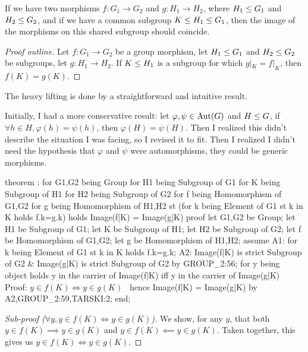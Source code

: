 \begin{theorem}
If we have two morphisms $f\colon G_{1}\to G_{2}$ and $g\colon H_{1}\to
H_{2}$, where $H_{1}\leq G_{1}$ and $H_{2}\leq G_{2}$, and if
we have a common subgroup $K\leq H_{1}\leq G_{1}$, then the
image of the morphisms on this shared subgroup should coincide.
\end{theorem}

\begin{proof}[Proof outline]
  Let $f\colon G_{1}\to G_{2}$ be a group morphism, let $H_{1}\leq G_{1}$
  and $H_{2}\leq G_{2}$ be subgroups, let $g\colon H_{1}\to H_{2}$.
  If $K\leq H_{1}$ is a subgroup for which $g|_{K}=f|_{K}$, then $f(K)=g(K)$.
\end{proof}


\begin{thm-remark}
The heavy lifting is done by a straightforward and intuitive result.

Initially, I had a more conservative result: let $\varphi,\psi\in\operatorname{Aut}(G)$
and $H\leq G$, if $\forall h\in H,\varphi(h)=\psi(h)$, then
$\varphi(H)=\psi(H)$. Then I realized this didn't describe the situation
I was facing, so I revised it to fit. Then I realized I didn't need the
hypothesis that $\varphi$ and $\psi$ were automorphisms, they could be
generic morphisms.
\end{thm-remark}

\nwenddocs{}\endmoddef\nwstartdeflinemarkup{}\nwenddeflinemarkup
theorem :
  for G1,G2 being Group
  for H1 being Subgroup of G1
  for K being Subgroup of H1
  for H2 being Subgroup of G2
  for f being Homomorphism of G1,G2
  for g being Homomorphism of H1,H2
  st (for k being Element of G1 st k in K holds f.k=g.k)
  holds Image(f|K) = Image(g|K)
proof
  let G1,G2 be Group;
  let H1 be Subgroup of G1;
  let K be Subgroup of H1;
  let H2 be Subgroup of G2;
  let f be Homomorphism of G1,G2;
  let g be Homomorphism of H1,H2;
  assume A1: for k being Element of G1 st k in K holds f.k=g.k;
  A2: Image(f|K) is strict Subgroup of G2 &
      Image(g|K) is strict Subgroup of G2 by GROUP_2:56;
  for y being object
  holds y in the carrier of Image(f|K) iff y in the carrier of Image(g|K)
  \LA{}Proof: $y\in f(K)\iff y\in g(K)$~{\nwtagstyle{}}\RA{}
  hence Image(f|K) = Image(g|K) by A2,GROUP_2:59,TARSKI:2;
end;
\eatline
{}\nwendcode{}\nwdocspar
\begin{proof}[Sub-proof ($\forall y,y\in f(K)\iff y\in g(K)$)]
  We show, for any $y$, that both $y\in f(K)\implies y\in g(K)$ and
  $y\in f(K)\impliedby y\in g(K)$. Taken together, this gives us
  $y\in f(K)\iff y\in g(K)$.
\end{proof}

